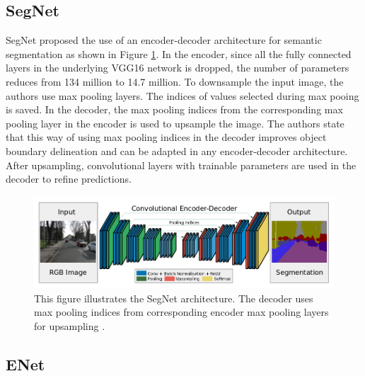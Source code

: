 \subsection{SegNet}

SegNet \cite{DBLP:journals/corr/BadrinarayananK15} proposed the use of an encoder-decoder architecture for semantic segmentation as shown in Figure \ref{Fig:segnet}. In the encoder, since all the fully connected layers in the underlying VGG16 network is dropped, the number of parameters reduces from 134 million to 14.7 million. To downsample the input image, the authors use max pooling layers. The indices of values selected during max pooing is saved. In the decoder, the max pooling indices from the corresponding max pooling layer in the encoder is used to upsample the image. The authors state that this way of using max pooling indices in the decoder improves object boundary delineation and can be adapted in any encoder-decoder architecture. After upsampling, convolutional layers with trainable parameters are used in the decoder to refine predictions. 

	\begin{figure}[h]
		\centering
		\includegraphics[width=1\linewidth]{images/segnet}
		\caption{This figure illustrates the SegNet architecture. The decoder uses max pooling indices from corresponding encoder max pooling layers for upsampling \cite{DBLP:journals/corr/BadrinarayananK15}.}
		\label{Fig:segnet}
	\end{figure}

\subsection{ENet}

